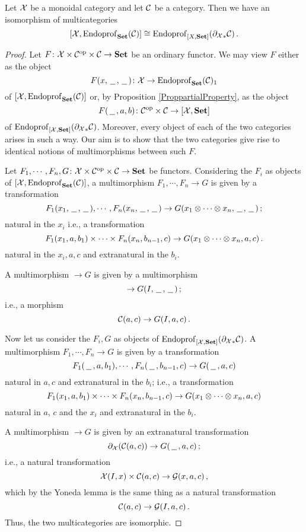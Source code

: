 \begin{theorem}
  \label{StokessTheorem}
  Let $\mathcal X$ be a monoidal category and let ${\mathcal{C}}$ be a category.  
  Then we have an isomorphism of multicategories
  \[
    [\mathcal X,\operatorname{Endoprof}_{{\normalfont\textbf{Set}}}({\mathcal{C}})] \cong \operatorname{Endoprof}_{[X,{\normalfont\textbf{Set}}]}({\partial_\mathcal X}_*{\mathcal{C}})\,.
    \]
\end{theorem}
\begin{proof}
  Let $F \colon \mathcal X\times{\mathcal{C}}^{\mathrm{op}}\times{\mathcal{C}} \to {\normalfont\textbf{Set}}$ be an ordinary functor.  
  We may view $F$ either as the object
  \[
    F(x, \,\underline{\hspace{1.5ex}}\,, \,\underline{\hspace{1.5ex}}\,) \colon \mathcal X \to \operatorname{Endoprof}_{\normalfont\textbf{Set}}({\mathcal{C}})_1
    \]
  of $[\mathcal X,\operatorname{Endoprof}_{{\normalfont\textbf{Set}}}({\mathcal{C}})]$ or, by Proposition \ref{ProppartialProperty}, as the object
  \[
    F(\,\underline{\hspace{1.5ex}}\,, a, b) \colon {\mathcal{C}}^{\mathrm{op}} \times {\mathcal{C}} \to [\mathcal X,{\normalfont\textbf{Set}}]
    \]
  of $\operatorname{Endoprof}_{[\mathcal X,{\normalfont\textbf{Set}}]}({\partial_\mathcal X}_*{\mathcal{C}})$.
  Moreover, every object of each of the two categories arises in such a way.  
  Our aim is to show that the two categories give rise to identical notions of multimorphisms between such $F$.

  Let $F_1,\cdots,F_n,G \colon \mathcal X \times {\mathcal{C}}^{\mathrm{op}}\times{\mathcal{C}}\to {\normalfont\textbf{Set}}$ be functors.  
  Considering the $F_i$ as objects of $[\mathcal X,\operatorname{Endoprof}_{\normalfont\textbf{Set}}({\mathcal{C}})]$, a multimorphism $F_1,\cdots,F_n\to G$ is given by a transformation
  \[
    F_1(x_1,\,\underline{\hspace{1.5ex}}\,,\,\underline{\hspace{1.5ex}}\,),\cdots, F_n(x_n,\,\underline{\hspace{1.5ex}}\,,\,\underline{\hspace{1.5ex}}\,) \to G(x_1\otimes\cdots\otimes x_n,\,\underline{\hspace{1.5ex}}\,,\,\underline{\hspace{1.5ex}}\,)\,;
    \]
  natural in the $x_i$ i.e., a transformation
  \[
    F_1(x_1,a,b_1)\times\cdots\times F_n(x_n,b_{n-1},c) \to G(x_1\otimes\cdots\otimes x_n,a,c)\,.
    \]
  natural in the $x_i,a,c$ and extranatural in the $b_i$.

  A multimorphism $\to G$ is given by a multimorphism
  \[
    \to G(I,\,\underline{\hspace{1.5ex}}\,,\,\underline{\hspace{1.5ex}}\,)\,;
    \]
  i.e., a morphism
  \[
    {\mathcal{C}}(a,c) \to G(I,a,c)\,.
    \]

  Now let us consider the $F_i,G$ as objects of $\operatorname{Endoprof}_{[\mathcal X,{\normalfont\textbf{Set}}]}({\partial_\mathcal X}_*{\mathcal{C}})$.  
  A multimorphism $F_1,\cdots,F_n\to G$ is given by a transformation
  \[
    F_1(\,\underline{\hspace{1.5ex}}\,,a,b_1),\cdots,F_n(\,\underline{\hspace{1.5ex}}\,,b_{n-1},c) \to G(\,\underline{\hspace{1.5ex}}\,,a,c)
    \]
  natural in $a,c$ and extranatural in the $b_i$; i.e., a transformation
  \[
    F_1(x_1,a,b_1)\times\cdots\times F_n(x_n,b_{n-1},c) \to G(x_1\otimes\cdots\otimes x_n,a,c)
    \]
  natural in $a$, $c$ and the $x_i$ and extranatural in the $b_i$.  

  A multimorphism $\to G$ is given by an extranatural transformation
  \[
    \partial_\mathcal X({\mathcal{C}}(a,c)) \to G(\,\underline{\hspace{1.5ex}}\,,a,c)\,;
    \]
  i.e., a natural transformation
  \[
    \mathcal X(I,x)\times{\mathcal{C}}(a,c) \to \mathcal G(x,a,c)\,,
    \]
  which by the Yoneda lemma is the same thing as a natural transformation
  \[
    {\mathcal{C}}(a,c) \to \mathcal G(I,a,c)\,.
    \]
  Thus, the two multicategories are isomorphic.
\end{proof}

